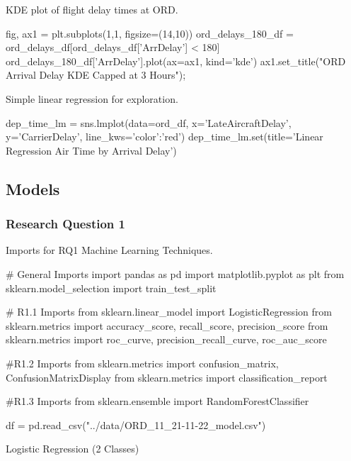 \documentclass[a4paper,12pt]{article}
\begin{document}
KDE plot of flight delay times at ORD.

\begin{python}

fig, ax1 = plt.subplots(1,1, figsize=(14,10))
ord_delays_180_df = ord_delays_df[ord_delays_df['ArrDelay'] < 180] 
ord_delays_180_df['ArrDelay'].plot(ax=ax1, kind='kde')
ax1.set_title("ORD Arrival Delay KDE Capped at 3 Hours");

\end{python}

Simple linear regression for exploration.

\begin{python}

dep_time_lm = sns.lmplot(data=ord_df, x='LateAircraftDelay', y='CarrierDelay', line_kws={'color':'red'})
dep_time_lm.set(title='Linear Regression Air Time by Arrival Delay')

\end{python}


\subsection{Models}

\subsubsection{Research Question 1} \label{model:rq1_code}

Imports for RQ1 Machine Learning Techniques.
\begin{python}
# General Imports
import pandas as pd
import matplotlib.pyplot as plt
from sklearn.model_selection import train_test_split

# R1.1 Imports
from sklearn.linear_model import LogisticRegression
from sklearn.metrics import accuracy_score, recall_score, precision_score
from sklearn.metrics import roc_curve, precision_recall_curve, roc_auc_score

#R1.2 Imports
from sklearn.metrics import confusion_matrix, ConfusionMatrixDisplay
from sklearn.metrics import classification_report

#R1.3 Imports
from sklearn.ensemble import RandomForestClassifier

df = pd.read_csv("../data/ORD_11_21-11-22_model.csv")
\end{python}

Logistic Regression (2 Classes)
\end{document}
